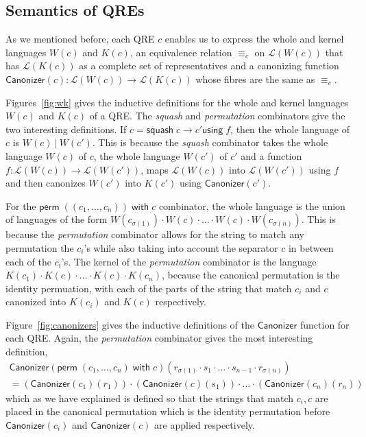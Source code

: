 \documentclass[acmsmall,review,anonymous]{acmart}\settopmatter{printfolios=true,printccs=false,printacmref=false}
\newcommand{\kw}[1]{\ensuremath{\mathsf{#1}}}
\newcommand{\squash}[3]{\ensuremath{\kw{squash} \; #1 \rightarrow #2
\kw{using} \; #3}}
\newcommand{\perm}[2]{\ensuremath{\kw{perm}\; (#1)\; \kw{with}\; #2}}
\newcommand{\sep}{\ensuremath{\ | \ }}
\newcommand{\canonizer}{\ensuremath{\kw{Canonizer}}}
\newcommand{\eqrel}[1]{\ensuremath{\equiv_{#1}}}
\begin{document}
\subsection{Semantics of QREs}
As we mentioned before, each QRE $c$ enables us to express the whole and kernel
languages $W(c)$ and $K(c)$, an equivalence relation $\eqrel{c}$ on
$\mathcal{L}(W(c))$ that has $\mathcal{L}(K(c))$ as a complete set of
representatives and a canonizing function $\canonizer(c):\mathcal{L}(W(c))
\longrightarrow \mathcal{L}(K(c))$ whose fibres are the same as $\eqrel{c}$.

Figures~\ref{fig:wk} gives the inductive definitions for the whole and
kernel languages $W(c)$ and $K(c)$ of a QRE. The \textit{squash} and
\textit{permutation} combinators give the two interesting definitions. If $c =
\squash{c}{c'}{f}$, then the whole language of $c$ is $W(c) \sep W(c')$. This
is because the \textit{squash} combinator takes the whole language $W(c)$ of
$c$, the whole language $W(c')$ of $c'$ and a function $f : \mathcal{L}(W(c))
\longrightarrow \mathcal{L}(W(c'))$, maps $\mathcal{L}(W(c))$ into
$\mathcal{L}(W(c'))$ using $f$ and then canonizes $W(c')$ into $K(c')$ using
$\canonizer(c')$.

For the $\perm{(c_1, \ldots, c_n)}{c}$ combinator, the whole language is the
union of languages of the form $W(c_{\sigma(1)}) \cdot W(c) \cdot \ldots \cdot
W(c) \cdot W(c_{\sigma(n)})$. This is because the \textit{permutation}
combinator allows for the string to match any permutation the $c_i$'s while also
taking into account the separator $c$ in between each of the $c_i$'s. The kernel
of the \textit{permutation} combinator is the language $K(c_1) \cdot K(c) \cdot
\ldots \cdot K(c) \cdot K(c_n)$, because the canonical permutation is the
identity permuation, with each of the parts of the string that match $c_i$
and $c$ canonized into $K(c_i)$ and $K(c)$ respectively.

Figure~\ref{fig:canonizers} gives the inductive definitions of the
$\canonizer{}$ function for each QRE. Again, the \textit{permutation} combinator
gives the most interesting definition,
\begin{align*}\canonizer(\perm{c_1, \ldots, c_n}{c})(r_{\sigma(1)}
\cdot s_1 \cdot \ldots \cdot s_{n-1} \cdot r_{\sigma(n)}) \\
= (\canonizer(c_1)(r_1)) \cdot (\canonizer(c)(s_1)) \cdot \ldots \cdot
(\canonizer(c_n)(r_n))
\end{align*}
\noindent which as we have explained is defined so that the strings that match
$c_i, c$ are placed in the canonical permutation which is the identity
permutation before $\canonizer(c_i)$ and $\canonizer(c)$ are applied
respectively.
\end{document}
